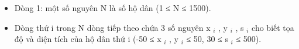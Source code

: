 \begin{itemize}
	\item     Dòng 1: một số nguyên N là số hộ dân (1 ≤ N ≤ 1500).   
	\item     Dòng thứ i trong N dòng tiếp theo chứa 3 số nguyên x    $_     i    $    , y    $_     i    $    , s    $_     i    $    cho biết tọa độ và diện tích của hộ dân thứ i (-50 ≤ x    $_     i    $    , y    $_     i    $    ≤ 50, 30 ≤ s    $_     i    $    ≤ 500).   
\end{itemize}

\